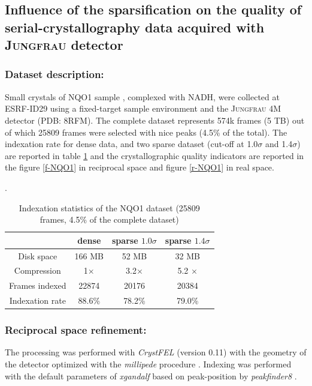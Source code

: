 \documentclass[preprint]{iucr}              %
\begin{document}
\subsection{Influence of the sparsification on the quality of serial-crystallography data acquired with \textsc{Jungfrau} detector}
\subsubsection{Dataset description:} 

Small crystals of NQO1 sample \cite{NQO1}, complexed with NADH, were collected at ESRF-ID29 using a fixed-target sample environment and the \textsc{Jungfrau} 4M detector (PDB: 8RFM). 
The complete dataset represents 574k frames (5 TB) out of which 25809 frames were selected with nice peaks (4.5\% of the total).
The indexation rate for dense data, and two sparse dataset (cut-off at 1.0$\sigma$ and 1.4$\sigma$) are reported in table \ref{t-NQO1} and the crystallographic quality indicators are reported in the figure \ref{f-NQO1} in reciprocal space and figure \ref{r-NQO1} in real space. 

\begin{table}
\label{t-NQO1}
\begin{center}
\caption{Indexation statistics of the NQO1 dataset (25809 frames, 4.5\% of the complete dataset)}.
\begin{tabular}{|c|c | c | c |} 
\hline
       & dense & sparse $1.0\sigma$ & sparse $1.4\sigma$ \\ 
\hline
Disk space & 166 MB & 52 MB & 32 MB \\
Compression & 1$\times$ & 3.2$\times$ & 5.2 $\times$ \\
Frames indexed  & 22874 & 20176 & 20384 \\
Indexation rate & 88.6\%& 78.2\% & 79.0\%\\
\hline
\end{tabular}
\end{center}
\end{table}

\subsubsection{Reciprocal space refinement:}

The processing was performed with \textit{CrystFEL} \cite{CrystFEL} (version 0.11) with the geometry of the detector optimized with the \textit{millipede} procedure \cite{millepede, millepede2}. 
Indexing was performed with the default parameters of \textit{xgandalf} \cite{xgandalf} based on peak-position by \textit{peakfinder8} \cite{Cheetah2014}.
\end{document}
